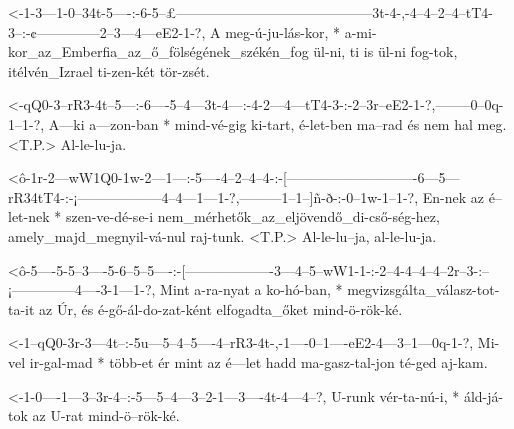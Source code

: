   {<-1-3---1-0--34t-5----:-6-5--£------------------------------------------3t-4-,-4--4--2--4--tT4-3--:-¢--------------2--3---4---eE2-1-?,}
  {  A meg-ú-ju-lás-kor, * a-mi-kor_az_Emberfia_az_ő_fölségének_székén_fog ül-ni, ti is ül-ni fog-tok, itélvén_Izrael ti-zen-két tör-zsét.}



  {<-qQ0-3--rR3-4t--5---:-6----5--4---3t-4---:-4-2---4---tT4-3-:-2--3r--eE2-1-?,--------0--0q-1--1-?,}
  {  A---ki a---zon-ban * mind-vé-gig ki-tart, é-let-ben ma--rad és nem hal meg. <T.P.> Al-le-lu-ja.}

  {<ô-1r-2---wW1Q0-1w-2---1---:-5----4--2--4--4-:-[----------------------------6---5---rR34tT4-:-¡------------------4--4---1---1-?,---------1--1--]ñ-ð-:-0--1w-1--1-?,}
  {   En-nek az    é--let-nek * szen-ve-dé-se-i   nem_mérhetők_az_eljövendő_di-cső-ség-hez,      amely_majd_megnyil-vá-nul raj-tunk. <T.P.> Al-le-lu--ja, al-le-lu-ja.}

  {<ô-5----5-5--3----5-6--5--5----:-[-------------------3---4--5--wW1-1-:-2--4-4--4--4--2r--3-:--¡--------------4----3-1---1-?,}
  {   Mint a-ra-nyat a ko-hó-ban, * megvizsgálta_válasz-tot-ta-it az  Úr, és é-gő-ál-do-zat-ként elfogadta_őket mind-ö-rök-ké. }


  {<-1--qQ0-3r-3---4t--:-5u---5--4--5----4--rR3-4t-,-1----0--1----eE2-4---3--1---0q-1-?,}
  {  Mi-vel ir-gal-mad * több-et ér mint az é---let  hadd ma-gasz-tal-jon té-ged aj-kam.}

  {<-1-0----1---3--3r-4--:-5---5--4---3--2-1---3----4t-4---4--?,}
  {  U-runk vér-ta-nú-i, * áld-já-tok az U-rat mind-ö--rök-ké.}


